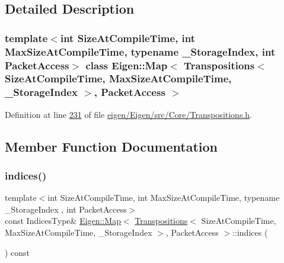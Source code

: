 \subsection{Detailed Description}
\subsubsection*{template$<$int Size\+At\+Compile\+Time, int Max\+Size\+At\+Compile\+Time, typename \+\_\+\+Storage\+Index, int Packet\+Access$>$\newline
class Eigen\+::\+Map$<$ Transpositions$<$ Size\+At\+Compile\+Time, Max\+Size\+At\+Compile\+Time, \+\_\+\+Storage\+Index $>$, Packet\+Access $>$}



Definition at line \hyperlink{eigen_2_eigen_2src_2_core_2_transpositions_8h_source_l00231}{231} of file \hyperlink{eigen_2_eigen_2src_2_core_2_transpositions_8h_source}{eigen/\+Eigen/src/\+Core/\+Transpositions.\+h}.



\subsection{Member Function Documentation}
\mbox{\label{class_eigen_1_1_map_3_01_transpositions_3_01_size_at_compile_time_00_01_max_size_at_compile_timecc993082d7c0ba51ca94b27e97da8dd3_a08d5e1dd2e82fc92b82873bf740e4f24}} 
\subsubsection{\texorpdfstring{indices()}{indices()}\hspace{0.1cm}{\footnotesize\ttfamily [1/4]}}
{\footnotesize\ttfamily template$<$int Size\+At\+Compile\+Time, int Max\+Size\+At\+Compile\+Time, typename \+\_\+\+Storage\+Index , int Packet\+Access$>$ \\
const Indices\+Type\& \hyperlink{group___core___module_class_eigen_1_1_map}{Eigen\+::\+Map}$<$ \hyperlink{group___core___module_class_eigen_1_1_transpositions}{Transpositions}$<$ Size\+At\+Compile\+Time, Max\+Size\+At\+Compile\+Time, \+\_\+\+Storage\+Index $>$, Packet\+Access $>$\+::indices (\begin{DoxyParamCaption}{ }\end{DoxyParamCaption}) const\hspace{0.3cm}{\ttfamily [inline]}}

